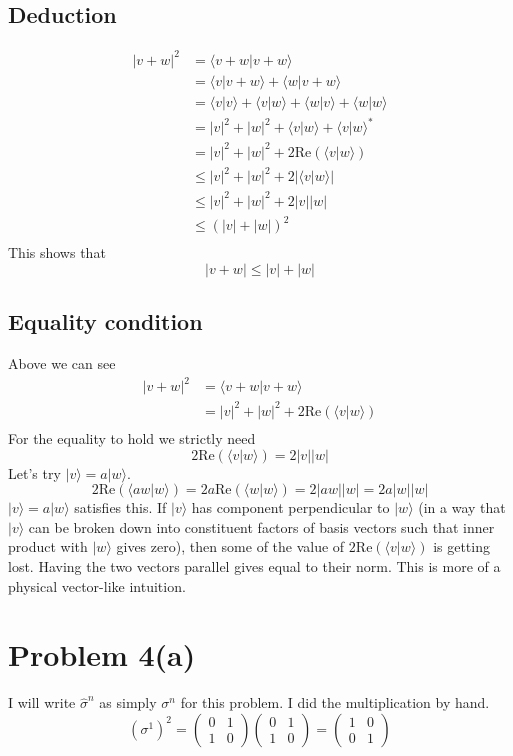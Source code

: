 \documentclass[letter]{article}
\begin{document}
\subsection*{Deduction} 
\begin{align*}
	| v + w | ^2 &=   \langle v + w | v + w \rangle  \\ 
	&= \langle v | v + w \rangle  + \langle w | v + w \rangle \\
	&=  \langle v | v \rangle + \langle v | w \rangle + 
	\langle w | v \rangle + \langle w | w \rangle \\ 
	&= | v | ^2 + | w | ^2 + \langle v| w \rangle + \langle v | w \rangle^* \\
	&= | v | ^2 + | w | ^2 + 2 \text{Re}\left( \langle v | w \rangle\right) \\
	&\le  |v|^2 + |w|^2 + 2 | \langle v | w \rangle |  \\
	&\le  |v|^2 + |w|^2 + 2 |v  | | w |  \\ 
	&\le \left( |v| + |w|\right)^2 \\
\end{align*}
This shows that 
\[
|v + w |  \le |v| + |w| 
\] 
\subsection*{Equality condition} 
Above we can see
\begin{align*}
	| v + w | ^2 &=   \langle v + w | v + w \rangle  \\ 
	&= | v | ^2 + | w | ^2 + 2 \text{Re}\left( \langle v | w \rangle\right) \\
\end{align*}
For the equality to hold we strictly need 
\[
2 \text{Re}\left( \langle v | w \rangle\right) = 2 |v | |w|  
\]
Let's try $| v \rangle  = a | w \rangle $.  
\[
2 \text{Re}\left( \langle a w | w \rangle\right) = 
2a \text{Re} \left( \langle w | w \rangle \right)=
2 |aw | |w| = 2 a |w| |w|   
\]
$| v \rangle  = a | w \rangle $ satisfies this. If $| v \rangle $ has component perpendicular to $| w \rangle $ (in a way that $| v \rangle $ can be broken down into constituent factors of basis vectors such that inner product with $| w \rangle $ gives zero), then some of the value of $2 \text{Re} ( \langle v | w \rangle )$ is getting lost. Having the two vectors parallel gives equal to their norm. This is more of a physical vector-like intuition.



\section*{Problem 4(a)}
I will write $\hat{\sigma}^{n}$ as simply $\sigma^{n}$ for this problem. I did the multiplication by hand. 
\[
	(\sigma^{1})^2 = 
	\begin{pmatrix} 0 & 1 \\ 1 & 0 \end{pmatrix} 
	\begin{pmatrix} 0 & 1 \\ 1 & 0 \end{pmatrix}  = 
	\begin{pmatrix} 1 & 0 \\ 0 & 1 \end{pmatrix} 
\] 
\end{document}
